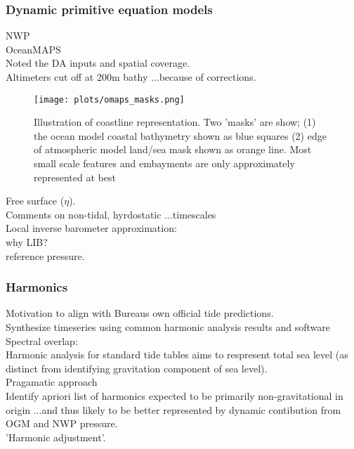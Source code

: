 

\subsubsection{Dynamic primitive equation models}

NWP\\
OceanMAPS\\

Noted the DA inputs and spatial coverage.\\
Altimeters cut off at 200m bathy ...because of corrections.



\begin{figure}[H]
    \centering
    \texttt{[image: plots/omaps\_masks.png]}
    \caption{Illustration of coastline representation. Two 'masks' are show; (1) the ocean model coastal bathymetry shown as blue squares (2) edge of atmospheric model land/sea mask shown as orange line.   Most small scale features and embayments are only approximately represented at best }
    \label{fig:map_masks}
\end{figure}  

Free surface ($\eta$).\\
Comments on non-tidal, hyrdostatic ...timescales\\


Local inverse barometer approximation:\\
why LIB?\\
reference pressure.




\subsubsection{Harmonics}
Motivation to align with Bureaus own official tide predictions.\\
Synthesize timeseries using common harmonic analysis results and software\\

Spectral overlap:\\
Harmonic analysis for standard tide tables aims to respresent total sea level (as distinct from identifying gravitation component of sea level).\\
Pragamatic approach\\
Identify apriori list of harmonics expected to be primarily non-gravitational in origin ...and thus likely to be better represented by dynamic contibution from OGM and NWP pressure.\\
'Harmonic  adjustment'.




